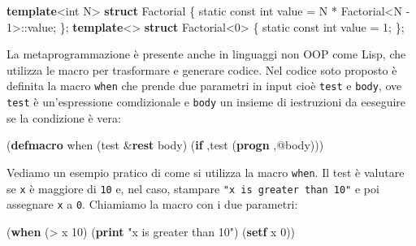\documentclass[
  letterpaper,
  DIV=11,
  numbers=noendperiod]{scrreprt}
\newenvironment{Shaded}{\begin{snugshade}}{\end{snugshade}}
\newcommand{\AttributeTok}[1]{\textcolor[rgb]{0.40,0.45,0.13}{#1}}
\newcommand{\DataTypeTok}[1]{\textcolor[rgb]{0.68,0.00,0.00}{#1}}
\newcommand{\DecValTok}[1]{\textcolor[rgb]{0.68,0.00,0.00}{#1}}
\newcommand{\FunctionTok}[1]{\textcolor[rgb]{0.28,0.35,0.67}{#1}}
\newcommand{\KeywordTok}[1]{\textcolor[rgb]{0.00,0.23,0.31}{\textbf{#1}}}
\newcommand{\NormalTok}[1]{\textcolor[rgb]{0.00,0.23,0.31}{#1}}
\newcommand{\OperatorTok}[1]{\textcolor[rgb]{0.37,0.37,0.37}{#1}}
\newcommand{\StringTok}[1]{\textcolor[rgb]{0.13,0.47,0.30}{#1}}
\begin{document}
\begin{Shaded}
\begin{Highlighting}[]
\KeywordTok{template}\OperatorTok{\textless{}}\DataTypeTok{int}\NormalTok{ N}\OperatorTok{\textgreater{}}
\KeywordTok{struct}\NormalTok{ Factorial }\OperatorTok{\{}
    \AttributeTok{static} \AttributeTok{const} \DataTypeTok{int}\NormalTok{ value }\OperatorTok{=}\NormalTok{ N }\OperatorTok{*}\NormalTok{ Factorial}\OperatorTok{\textless{}}\NormalTok{N }\OperatorTok{{-}} \DecValTok{1}\OperatorTok{\textgreater{}::}\NormalTok{value}\OperatorTok{;}
\OperatorTok{\};}
\KeywordTok{template}\OperatorTok{\textless{}\textgreater{}}
\KeywordTok{struct}\NormalTok{ Factorial}\OperatorTok{\textless{}}\DecValTok{0}\OperatorTok{\textgreater{}} \OperatorTok{\{}
    \AttributeTok{static} \AttributeTok{const} \DataTypeTok{int}\NormalTok{ value }\OperatorTok{=} \DecValTok{1}\OperatorTok{;}
\OperatorTok{\};}
\end{Highlighting}
\end{Shaded}

La metaprogrammazione è presente anche in linguaggi non OOP come Lisp,
che utilizza le macro per trasformare e generare codice. Nel codice soto
proposto è definita la macro \texttt{when} che prende due parametri in
input cioè \texttt{test} e \texttt{body}, ove \texttt{test} è
un'espressione comdizionale e \texttt{body} un insieme di iestruzioni da
eeseguire se la condizione è vera:

\begin{Shaded}
\begin{Highlighting}[]
\NormalTok{(}\KeywordTok{defmacro}\FunctionTok{ when }\NormalTok{(test \&}\KeywordTok{rest}\NormalTok{ body)}
\NormalTok{  \textasciigrave{}(}\KeywordTok{if}\NormalTok{ ,test}
\NormalTok{       (}\KeywordTok{progn}\NormalTok{ ,@body)))}
\end{Highlighting}
\end{Shaded}

Vediamo un esempio pratico di come si utilizza la macro \texttt{when}.
Il test è valutare se \texttt{x} è maggiore di \texttt{10} e, nel caso,
stampare \texttt{"x\ is\ greater\ than\ 10"} e poi assegnare \texttt{x}
a \texttt{0}. Chiamiamo la macro con i due parametri:

\begin{Shaded}
\begin{Highlighting}[]
\NormalTok{(}\KeywordTok{when}\NormalTok{ (}\OperatorTok{\textgreater{}}\NormalTok{ x }\DecValTok{10}\NormalTok{)}
\NormalTok{  (}\KeywordTok{print} \StringTok{"x is greater than 10"}\NormalTok{)}
\NormalTok{  (}\KeywordTok{setf}\NormalTok{ x }\DecValTok{0}\NormalTok{))}
\end{Highlighting}
\end{Shaded}
\end{document}
